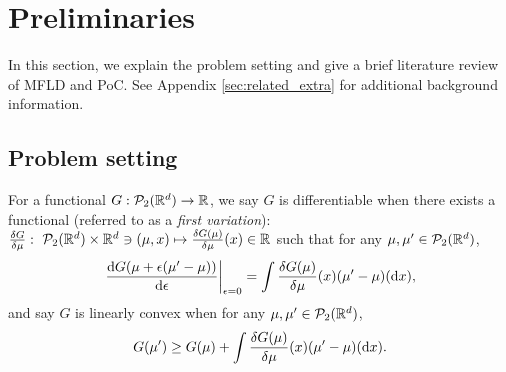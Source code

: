 \section{Preliminaries}
In this section, we explain the problem setting and give a brief literature review of MFLD and PoC. See Appendix \ref{sec:related_extra} for additional background information.
\subsection{Problem setting}
For a functional $G:\mathcal{P}_2(\mathbb{R}^d) \to \mathbb{R}$, we say $G$ is differentiable when there exists a functional (referred to as a {\it first variation}): $\frac{\delta G}{\delta \mu}:~\mathcal{P}_2(\mathbb{R}^d) \times \mathbb{R}^d \ni (\mu,x) \mapsto \frac{\delta G(\mu)}{\delta \mu}(x) \in \mathbb{R}$ such that for any $\mu, \mu' \in \mathcal{P}_2(\mathbb{R}^d)$,
\[ \left.\frac{\mathrm{d} G (\mu+\epsilon (\mu'-\mu))}{\mathrm{d}\epsilon} \right|_{\epsilon=0} 
= \int  \frac{\delta G(\mu)}{\delta \mu}(x) (\mu'-\mu)(\mathrm{d} x), \]
and say $G$ is linearly convex when for any $\mu, \mu' \in \mathcal{P}_2(\mathbb{R}^d)$,
\begin{equation}\label{eq:convexity}
G(\mu') \geq G(\mu) + \int \frac{\delta G(\mu)}{\delta \mu}(x)  (\mu'-\mu)(\mathrm{d} x).      
\end{equation}

